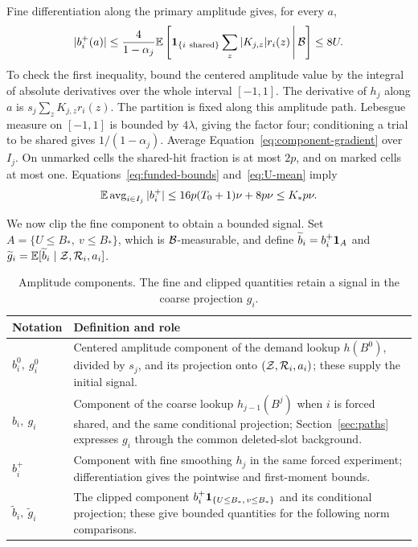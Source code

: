 Fine differentiation along the primary amplitude gives, for every $a$,
\begin{equation}\label{eq:component-gradient}
 |b_i^+(a)|\le\frac4{1-\alpha_j}
 \mathbb E\left[\mathbf 1_{\{i\ {\rm shared}\}}
             \sum_z|K_{j,z}|r_i(z)\,\middle|\,\mathcal B\right]\le8U.
\end{equation}
To check the first inequality, bound the centered amplitude value by
the integral of absolute derivatives over the whole interval $[-1,1]$.
The derivative of $h_j$ along $a$ is $s_j\sum_zK_{j,z}r_i(z)$.
The partition is fixed along this amplitude path. Lebesgue measure on
$[-1,1]$ is bounded by $4\lambda$, giving the factor four; conditioning
a trial to be shared gives $1/(1-\alpha_j)$.
Average Equation~\ref{eq:component-gradient} over $I_j$. On unmarked
cells the shared-hit fraction is at most $2p$, and on marked cells at
most one. Equations~\ref{eq:funded-bounds} and~\ref{eq:U-mean} imply
\begin{equation}\label{eq:component-L1}
 \mathbb E\operatorname{avg}_{i\in I_j}|b_i^+|
 \le16p(T_0+1)\nu+8p\nu\le K_*p\nu.
\end{equation}

We now clip the fine component to obtain a bounded signal. Set
$A=\{U\le B_*,\ v\le B_*\}$, which is $\mathcal B$-measurable, and
define $\widetilde b_i=b_i^+\mathbf 1_A$ and
$\widetilde g_i=\mathbb E[\widetilde b_i\mid\mathcal Z,\mathcal R_i,a_i]$.

\begin{table}[htbp]
\centering
\small
\begin{tabular}{@{}lp{}@{}}
\toprule
Notation & Definition and role \\
\midrule
$b_i^0,\ g_i^0$ & Centered amplitude component of the demand lookup
$h(B^0)$, divided by $s_j$, and its projection onto
$(\mathcal Z,\mathcal R_i,a_i)$; these supply the initial signal. \\[3pt]
$b_i,\ g_i$ & Component of the coarse lookup $h_{j-1}(B^j)$ when
$i$ is forced shared, and the same conditional projection;
Section~\ref{sec:paths} expresses $g_i$ through the common deleted-slot
background. \\[3pt]
$b_i^+$ & Component with fine smoothing $h_j$ in the same forced
experiment; differentiation gives the pointwise and first-moment bounds. \\[3pt]
$\widetilde b_i,\ \widetilde g_i$ & The clipped component
$b_i^+\mathbf 1_{\{U\le B_*,\,v\le B_*\}}$ and its conditional projection;
these give bounded quantities for the following norm comparisons. \\
\bottomrule
\end{tabular}
\caption{Amplitude components. The fine and clipped quantities retain a
signal in the coarse projection $g_i$.}
\label{tab:amplitude-notation}
\end{table}

